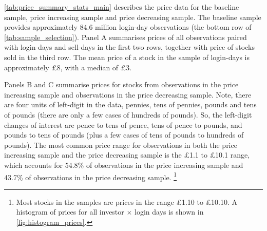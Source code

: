 \ref{tab:price_summary_stats_main} describes the price data for the baseline sample, price increasing sample and price decreasing sample. The baseline sample provides approximately 84.6 million login-day observations (the bottom row of \ref{tab:sample_selection}). Panel A summarises prices of all observations paired with login-days and sell-days in the first two rows, together with price of stocks sold in the third row. The mean price of a stock in the sample of login-days is approximately \pounds8, with a median of \pounds3. 

Panels B and C summarise prices for stocks from observations in the price increasing sample and observations in the price decreasing sample. Note, there are four units of left-digit in the data, pennies, tens of pennies, pounds and tens of pounds (there are only a few cases of hundreds of pounds). So, the left-digit changes of interest are pence to tens of pence, tens of pence to pounds, and pounds to tens of pounds (plus a few cases of tens of pounds to hundreds of pounds). The most common price range for observations in both the price increasing sample and the price decreasing sample is the \pounds1.1 to \pounds10.1 range, which accounts for 54.8\% of observations in the price increasing sample and 43.7\% of observations in the price decreasing sample. \footnote{Most stocks in the samples are prices in the range \pounds1.10 to \pounds10.10. A histogram of prices for all investor $\times$ login days is shown in \ref{fig:histogram_prices}.}


